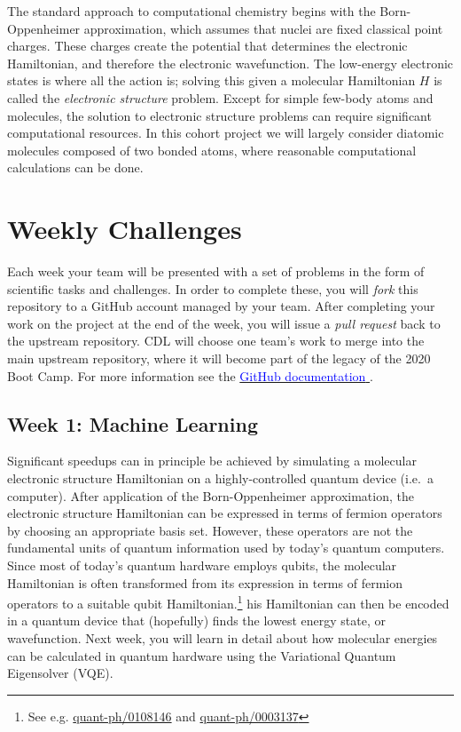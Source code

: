 \documentclass[12pt]{article}
\begin{document}
The standard approach to computational chemistry begins with the Born-Oppenheimer approximation, which assumes that nuclei are fixed classical point charges. These charges create the potential that determines the electronic Hamiltonian, and therefore the electronic wavefunction.  
The low-energy electronic states is where all the action is; solving this given a molecular Hamiltonian $H$ is
called the {\it electronic structure} problem.
Except for simple few-body atoms and molecules, the solution to electronic structure problems can require significant computational resources.  In this cohort project we will largely consider diatomic molecules composed of two bonded atoms, where reasonable computational calculations can be done.


\newpage

\section{Weekly Challenges}

Each week your team will be presented with a set of problems in the form of scientific tasks and challenges.  In order to complete these, you will {\it fork} this repository to a GitHub account managed by your team.  After completing your work on the project at the end of the week, you will issue a {\it pull request} back to the upstream repository.
CDL will choose one team's work to merge into the main upstream repository, where it will become part of the legacy of the 2020 Boot Camp.  For more information see the
\href{https://help.github.com/en/github/collaborating-with-issues-and-pull-requests/about-forks}{\textcolor{blue}{GitHub documentation} }.

\subsection{Week 1: Machine Learning}

Significant speedups can in principle be achieved by simulating a molecular electronic structure Hamiltonian
on a highly-controlled quantum device (i.e.~a computer).  
After application of the Born-Oppenheimer approximation, the electronic structure Hamiltonian can be 
expressed in terms of fermion operators by choosing an appropriate basis set.  However, these operators
are not the fundamental units of quantum information used by today's quantum computers.
Since most of today's quantum hardware employs qubits, 
the molecular Hamiltonian is often transformed from its expression in terms of fermion operators 
to a suitable qubit Hamiltonian.\footnote{See e.g. \href{https://arxiv.org/abs/quant-ph/0108146}{quant-ph/0108146} and \href{https://arxiv.org/abs/quant-ph/0003137}{quant-ph/0003137} }
his Hamiltonian can then be encoded in a quantum device that (hopefully)
finds the lowest energy state, or wavefunction.
Next week, you will learn in detail about how molecular energies can be calculated in quantum hardware using 
the Variational Quantum Eigensolver (VQE).
\end{document}
